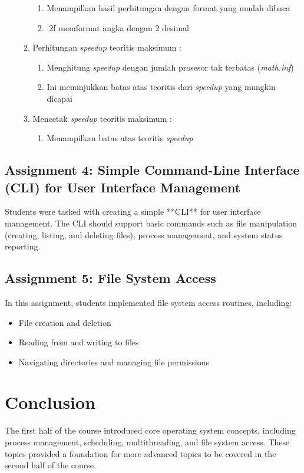 \documentclass[12pt]{article}
\begin{document}
\begin{enumerate}
\begin{enumerate}
\begin{enumerate}
                \item Menampilkan hasil perhitungan dengan format yang mudah dibaca
                \item .2f memformat angka dengan 2 desimal
            \end{enumerate}
        \item  Perhitungan \textit{speedup} teoritis maksimum :
            \begin{enumerate}
                \item Menghitung \textit{speedup} dengan jumlah prosesor tak terbatas (\textit{math.inf})
                \item Ini menunjukkan batas atas teoritis dari \textit{speedup} yang mungkin dicapai
            \end{enumerate}
        \item Mencetak \textit{speedup} teoritis maksimum :
            \begin{enumerate}
                \item Menampilkan batas atas teoritis \textit{speedup}
            \end{enumerate}


    \end{enumerate}
\end{enumerate}

\subsection{Assignment 4: Simple Command-Line Interface (CLI) for User Interface Management}
Students were tasked with creating a simple **CLI** for user interface management. The CLI should support basic commands such as file manipulation (creating, listing, and deleting files), process management, and system status reporting.

\subsection{Assignment 5: File System Access}
In this assignment, students implemented file system access routines, including:
\begin{itemize}
    \item File creation and deletion
    \item Reading from and writing to files
    \item Navigating directories and managing file permissions
\end{itemize}

\section{Conclusion}
The first half of the course introduced core operating system concepts, including process management, scheduling, multithreading, and file system access. These topics provided a foundation for more advanced topics to be covered in the second half of the course.
\end{document}
